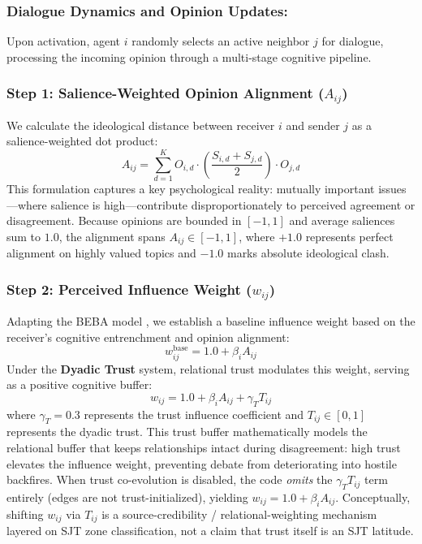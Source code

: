 \subsubsection{Dialogue Dynamics and Opinion Updates:} Upon activation, agent $i$ randomly selects an active neighbor $j$ for dialogue, processing the incoming opinion through a multi-stage cognitive pipeline.

\subsubsection{Step 1: Salience-Weighted Opinion Alignment ($A_{ij}$)}
We calculate the ideological distance between receiver $i$ and sender $j$ as a salience-weighted dot product:
\begin{equation}
    A_{ij} = \sum_{d=1}^K O_{i,d} \cdot \left(\frac{S_{i,d} + S_{j,d}}{2}\right) \cdot O_{j,d}
\end{equation}
This formulation captures a key psychological reality: mutually important issues---where salience is high---contribute disproportionately to perceived agreement or disagreement. Because opinions are bounded in $[-1, 1]$ and average saliences sum to $1.0$, the alignment spans $A_{ij} \in [-1, 1]$, where $+1.0$ represents perfect alignment on highly valued topics and $-1.0$ marks absolute ideological clash.

\subsubsection{Step 2: Perceived Influence Weight ($w_{ij}$)}
Adapting the BEBA model \citep{Chen2021}, we establish a baseline influence weight based on the receiver's cognitive entrenchment and opinion alignment:
\begin{equation}
    w_{ij}^{\text{base}} = 1.0 + \beta_i A_{ij}
\end{equation}
Under the \textbf{Dyadic Trust} system, relational trust modulates this weight, serving as a positive cognitive buffer:
\begin{equation}
    w_{ij} = 1.0 + \beta_i A_{ij} + \gamma_T T_{ij}
\end{equation}
where $\gamma_T = 0.3$ represents the trust influence coefficient and $T_{ij} \in [0, 1]$ represents the dyadic trust. This trust buffer mathematically models the relational buffer that keeps relationships intact during disagreement: high trust elevates the influence weight, preventing debate from deteriorating into hostile backfires. When trust co-evolution is disabled, the code \emph{omits} the $\gamma_T T_{ij}$ term entirely (edges are not trust-initialized), yielding $w_{ij} = 1.0 + \beta_i A_{ij}$. Conceptually, shifting $w_{ij}$ via $T_{ij}$ is a source-credibility / relational-weighting mechanism layered on SJT zone classification, not a claim that trust itself is an SJT latitude.

